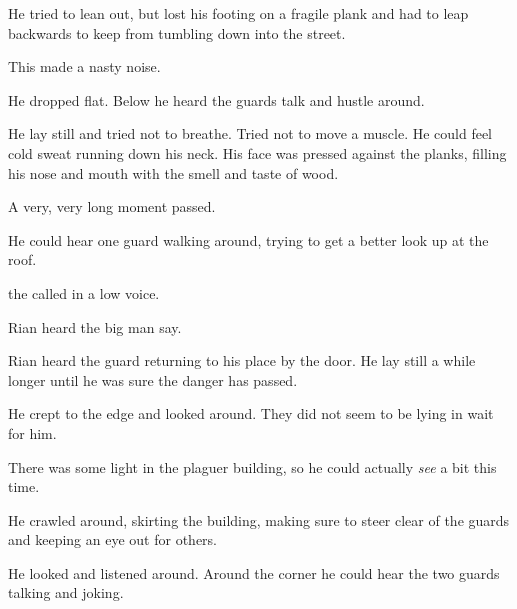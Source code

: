 He tried to lean out, but lost his footing on a fragile plank and had to leap backwards to keep from tumbling down into the street. 

This made a nasty  noise. 

He dropped flat. 
Below he heard the guards talk and hustle around.

He lay still and tried not to breathe. 
Tried not to move a muscle. 
He could feel cold sweat running down his neck. 
His face was pressed against the planks, filling his nose and mouth with the smell and taste of wood. 

A very, very long moment passed.

He could hear one guard walking around, trying to get a better look up at the roof. 

 the \dax{} called in a low voice. 

 Rian heard the big man say. 

Rian heard the guard returning to his place by the door. 
He lay still a while longer until he was sure the danger has passed.

He crept to the edge and looked around. 
They did not seem to be lying in wait for him. 

There was some light in the plaguer building, so he could actually \emph{see} a bit this time. 

He crawled around, skirting the building, making sure to steer clear of the guards and keeping an eye out for others. 


He looked and listened around. 
Around the corner he could hear the two guards talking and joking. 

